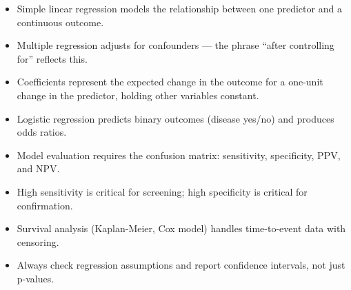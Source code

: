 \begin{itemize}
  \item Simple linear regression models the relationship between one predictor and a continuous outcome.
  \item Multiple regression adjusts for confounders --- the phrase ``after controlling for'' reflects this.
  \item Coefficients represent the expected change in the outcome for a one-unit change in the predictor, holding other variables constant.
  \item Logistic regression predicts binary outcomes (disease yes/no) and produces odds ratios.
  \item Model evaluation requires the confusion matrix: sensitivity, specificity, PPV, and NPV.
  \item High sensitivity is critical for screening; high specificity is critical for confirmation.
  \item Survival analysis (Kaplan-Meier, Cox model) handles time-to-event data with censoring.
  \item Always check regression assumptions and report confidence intervals, not just p-values.
\end{itemize}
